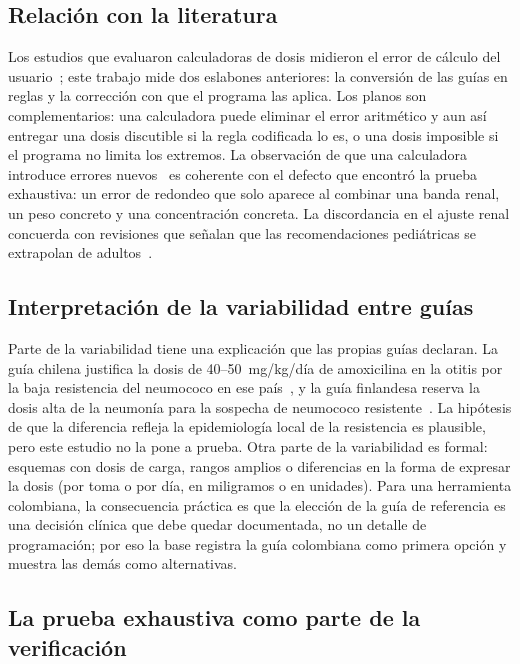 \documentclass[11pt,a4paper]{article}
\begin{document}
\subsection{Relación con la literatura}

Los estudios que evaluaron calculadoras de dosis midieron el error de cálculo del usuario~\citep{vanderzanden2020,higi2023}; este trabajo mide dos eslabones anteriores: la conversión de las guías en reglas y la corrección con que el programa las aplica. Los planos son complementarios: una calculadora puede eliminar el error aritmético y aun así entregar una dosis discutible si la regla codificada lo es, o una dosis imposible si el programa no limita los extremos. La observación de que una calculadora introduce errores nuevos~\citep{vanderzanden2020} es coherente con el defecto que encontró la prueba exhaustiva: un error de redondeo que solo aparece al combinar una banda renal, un peso concreto y una concentración concreta. La discordancia en el ajuste renal concuerda con revisiones que señalan que las recomendaciones pediátricas se extrapolan de adultos~\citep{schijvens2020,minotti2022}.

\subsection{Interpretación de la variabilidad entre guías}

Parte de la variabilidad tiene una explicación que las propias guías declaran. La guía chilena justifica la dosis de 40--50~mg/kg/día de amoxicilina en la otitis por la baja resistencia del neumococo en ese país~\citep{chileoma2019}, y la guía finlandesa reserva la dosis alta de la neumonía para la sospecha de neumococo resistente~\citep{backman2025}. La hipótesis de que la diferencia refleja la epidemiología local de la resistencia es plausible, pero este estudio no la pone a prueba. Otra parte de la variabilidad es formal: esquemas con dosis de carga, rangos amplios o diferencias en la forma de expresar la dosis (por toma o por día, en miligramos o en unidades). Para una herramienta colombiana, la consecuencia práctica es que la elección de la guía de referencia es una decisión clínica que debe quedar documentada, no un detalle de programación; por eso la base registra la guía colombiana como primera opción y muestra las demás como alternativas.

\subsection{La prueba exhaustiva como parte de la verificación}
\end{document}
